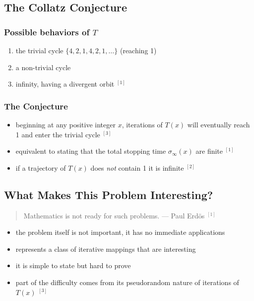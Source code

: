 \documentclass[12pt, a4paper, reqno]{amsart}
\begin{document}
\subsection{The Collatz Conjecture}

\subsubsection{Possible behaviors of $T$}

\begin{enumerate}
    \item the trivial cycle $\{4,2,1,4,2,1,\dots\}$ (reaching 1)
    \item a non-trivial cycle
    \item infinity, having a divergent orbit $^{[1]}$
\end{enumerate}

\subsubsection{The Conjecture}

\begin{itemize}
    \item beginning at any positive integer $x$, iterations of $T(x)$ will 
        eventually reach 1 and enter the trivial cycle $^{[3]}$
    \item equivalent to stating that the total stopping time 
        $\sigma_{\infty}(x)$ are finite $^{[1]}$
    \item if a trajectory of $T(x)$ does \textit{not} contain 1 it is infinite $^{[2]}$
\end{itemize}

\subsection{What Makes This Problem Interesting?}

\begin{quote}Mathematics is not ready for such problems. --- Paul Erdös $^{[1]}$\end{quote}
\begin{itemize}
    \item the problem itself is not important, it has no immediate applications
    \item represents a class of iterative mappings that are interesting
    \item it is simple to state but hard to prove
    \item part of the difficulty comes from its pseudorandom nature of 
        iterations of $T(x)$ $^{[3]}$
\end{itemize}
\end{document}
